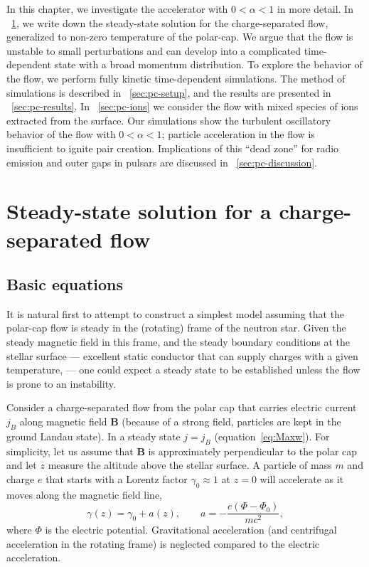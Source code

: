 In this chapter, we investigate the accelerator with $0<\alpha<1$ in more
detail. In \Sect~\ref{sec:pc-steady-state}, we write down the steady-state
solution for the charge-separated flow, generalized to non-zero temperature of
the polar-cap. We argue that the flow is unstable to small perturbations and can
develop into a complicated time-dependent state with a broad momentum
distribution. To explore the behavior of the flow, we perform fully kinetic
time-dependent simulations. The method of simulations is described in
\Sect~\ref{sec:pc-setup}, and the results are presented in
\Sect~\ref{sec:pc-results}. In \Sect~\ref{sec:pc-ions} we consider the flow with
mixed species of ions extracted from the surface. Our simulations show the
turbulent oscillatory behavior of the flow with $0<\alpha<1$; particle
acceleration in the flow is insufficient to ignite pair creation. Implications
of this ``dead zone'' for radio emission and outer gaps in pulsars are discussed
in \Sect~\ref{sec:pc-discussion}.


\section{Steady-state solution for a charge-separated flow}
\label{sec:pc-steady-state}


\subsection{Basic equations}


It is natural first to attempt to construct a simplest model
assuming that the polar-cap flow is steady in the (rotating) frame of the neutron star.
Given the steady magnetic field in this frame,
and the steady boundary conditions at the stellar surface --- excellent
static conductor that can supply charges with a given temperature, --- one
could expect a steady state to be established unless the flow is prone to an instability.

Consider a charge-separated flow from the polar cap that carries electric current
$j_B$ along magnetic field $\mathbf{B}$ (because of a strong field, particles are kept in
the ground Landau state).
In a steady state $j=j_B$ (equation~\ref{eq:Maxw}).
For simplicity, let us assume that $\mathbf{B}$ is approximately perpendicular to
the polar cap and let $z$ measure the altitude above the stellar surface.
A particle of mass $m$ and charge $e$ that starts with a Lorentz factor
$\gamma_0\approx 1$ at $z=0$ will accelerate as it moves along the magnetic
field line,
\begin{equation}
\label{eq:a}
    \gamma(z)=\gamma_0+a(z),  \qquad a=-\frac{e(\Phi-\Phi_0)}{mc^2},
\end{equation}
where $\Phi$ is the electric potential.
Gravitational acceleration (and centrifugal acceleration in the rotating frame) is
neglected compared to the electric acceleration.

